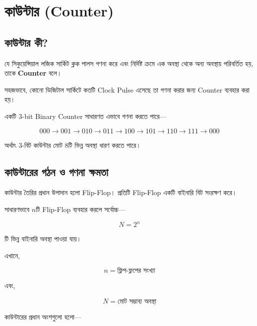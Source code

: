 
\section{কাউন্টার
(\textenglish{Counter})}

\subsection{কাউন্টার কী?}

যে সিকুয়েন্সিয়াল লজিক সার্কিট ক্লক পালস গণনা করে এবং
নির্দিষ্ট ক্রমে এক অবস্থা থেকে অন্য অবস্থায় পরিবর্তিত হয়,
তাকে \textbf{\textenglish{Counter}} বলে।

সহজভাবে, কোনো ডিজিটাল সার্কিটে কতটি
\textenglish{Clock Pulse} এসেছে তা গণনা করার জন্য
\textenglish{Counter} ব্যবহার করা হয়।

একটি \(3\)-\textenglish{bit Binary Counter} সাধারণত এভাবে গণনা করতে পারে—

\[
000\rightarrow001\rightarrow010\rightarrow011
\rightarrow100\rightarrow101\rightarrow110\rightarrow111
\rightarrow000
\]

অর্থাৎ \(3\)-বিট কাউন্টার মোট \(8\)টি ভিন্ন অবস্থা ধারণ করতে পারে।



\subsection{কাউন্টারের গঠন ও গণনা ক্ষমতা}

কাউন্টার তৈরির প্রধান উপাদান হলো
\textenglish{Flip-Flop}।
প্রতিটি \textenglish{Flip-Flop} একটি বাইনারি বিট সংরক্ষণ করে।

সাধারণভাবে \(n\)টি \textenglish{Flip-Flop} ব্যবহার করলে
সর্বোচ্চ—

\[
\boxed{
N=2^n
}
\]

টি ভিন্ন বাইনারি অবস্থা পাওয়া যায়।

এখানে,

\[
n=\text{ফ্লিপ-ফ্লপের সংখ্যা}
\]

এবং,

\[
N=\text{মোট সম্ভাব্য অবস্থা}
\]

কাউন্টারের প্রধান অংশগুলো হলো—

